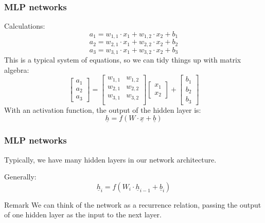\documentclass{beamer}
\begin{document}
\begin{frame}
    \frametitle{MLP networks}
    Calculations:
    \[a_{1} = w_{1, 1} \cdot x_1 + w_{1, 2} \cdot x_2 + b_{1}\]
    \[a_{2} = w_{2, 1} \cdot x_1 + w_{2, 2} \cdot x_2 + b_{2}\]
    \[a_{3} = w_{3, 1} \cdot x_1 + w_{3, 2} \cdot x_2 + b_{3}\] \pause
    This is a typical system of equations, so we can tidy things up with matrix algebra: \pause
    \[
        \begin{bmatrix}
            a_{1} \\
            a_{2} \\
            a_{3}
        \end{bmatrix}
        =
        \begin{bmatrix}
            w_{1, 1} & w_{1, 2} \\
            w_{2, 1} & w_{2, 2} \\
            w_{3, 1} & w_{3, 2} \\
        \end{bmatrix}
        \begin{bmatrix}
            x_1 \\
            x_2
        \end{bmatrix}
        +
        \begin{bmatrix}
            b_1 \\
            b_2 \\
            b_3
        \end{bmatrix}
    \] \pause
    With an activation function, the output of the hidden layer is:
    \[\underline{h} = f(W \cdot \underline{x} + \underline{b})\]
\end{frame}


\begin{frame}
    \frametitle{MLP networks}
    Typically, we have many hidden layers in our network architecture.
    \vspace{0.5cm}

    Generally:
    \[\underline{h}_i = f(W_i \cdot \underline{h}_{i - 1} + \underline{b}_i)\] \pause
    \begin{block}{Remark}
        We can think of the network as a recurrence relation, passing the output of one hidden layer as the input to the next layer.
    \end{block}
\end{frame}
\end{document}
